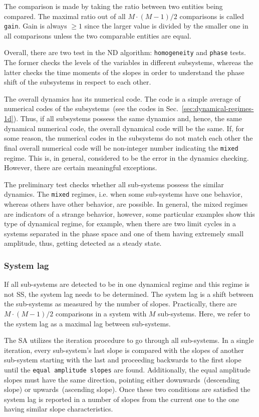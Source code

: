 \documentclass[11pt,a4paper]{article}
\begin{document}
The comparison is made by taking the ratio between two entities being compared. The
maximal ratio out of all $M\cdot(M-1)/2$ comparisons is called \texttt{gain}. Gain is
always $\ge 1$ since the larger value is divided by the smaller one in all
comparisons unless the two comparable entities are equal.

Overall, there are two test in the ND algorithm: \texttt{homogeneity} and
\texttt{phase} tests. The former checks the levels of the variables in different
subsystems, whereas the latter checks the time moments of the slopes in order to
understand the phase shift of the subsystems in respect to each other.

The overall dynamics has its numerical code. The code is a simple average of
numerical codes of the subsystems~(see the codes in
Sec.~\ref{sec:dynamical-regimes-1d}). Thus, if all subsystems possess the same
dynamics and, hence, the same dynamical numerical code, the overall dynamical code
will be the same. If, for some reason, the numerical codes in the subsystems do not
match each other the final overall numerical code will be non-integer number
indicating the \texttt{mixed} regime. This is, in general, considered to be the error
in the dynamics checking. However, there are certain meaningful exceptions.

The preliminary test checks whether all sub-systems possess the similar dynamics. The
\texttt{mixed} regimes, i.e. when some sub-systems have one behavior, whereas others
have other behavior, are possible. In general, the mixed regimes are indicators of a
strange behavior, however, some particular examples show this type of dynamical
regime, for example, when there are two limit cycles in a systems separated in the
phase space and one of them having extremely small amplitude, thus, getting detected
as a steady state.

\subsubsection{System lag}
\label{sec:phase-test}

If all sub-systems are detected to be in one dynamical regime and this regime is not
SS, the system lag needs to be determined. The system lag is a shift between the
sub-systems as measured by the number of slopes. Practically, there are $M\cdot(M-1)/2$
comparisons in a system with $M$ sub-systems. Here, we refer to the system lag as a
maximal lag between sub-systems.

The SA utilizes the iteration procedure to go through all sub-systems. In a single
iteration, every sub-system's last slope is compared with the slopes of another
sub-system starting with the last and proceeding backwards to the first slope until
the \texttt{equal amplitude slopes} are found. Additionally, the equal amplitude
slopes must have the same direction, pointing either downwards~(descending slope) or
upwards~(ascending slope). Once these two conditions are satisfied the system lag is
reported in a number of slopes from the current one to the one having similar
slope characteristics.
\end{document}
